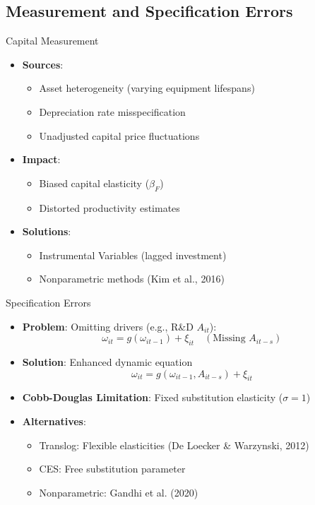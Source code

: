 \documentclass[aspectratio=169]{beamer}  %
\begin{document}
\subsection{Measurement and Specification Errors}
\begin{frame}{Capital Measurement}
\begin{itemize}
    \item \textbf{Sources}:
    \begin{itemize}
        \item Asset heterogeneity (varying equipment lifespans)
        \item Depreciation rate misspecification
        \item Unadjusted capital price fluctuations
    \end{itemize}
    
    \item \textbf{Impact}:
    \begin{itemize}
        \item Biased capital elasticity (\(\beta_F\))
        \item Distorted productivity estimates
    \end{itemize}
    
    \item \textbf{Solutions}:
    \begin{itemize}
        \item Instrumental Variables (lagged investment)
        \item Nonparametric methods (Kim et al., 2016)
    \end{itemize}
\end{itemize}
\end{frame}

\begin{frame}{Specification Errors}
\begin{itemize}
    \item \textbf{Problem}: Omitting drivers (e.g., R\&D \(A_{it}\)):
    \[
    \omega_{it} = g(\omega_{it-1}) + \xi_{it} \quad (\text{Missing } A_{it-s})
    \]
    
    \item \textbf{Solution}: Enhanced dynamic equation
    \[
    \omega_{it} = g(\omega_{it-1}, A_{it-s}) + \xi_{it}
    \]
\end{itemize}

\begin{itemize}
    \item \textbf{Cobb-Douglas Limitation}: Fixed substitution elasticity (\(\sigma=1\))
    \item \textbf{Alternatives}:
    \begin{itemize}
        \item Translog: Flexible elasticities (De Loecker \& Warzynski, 2012)
        \item CES: Free substitution parameter
        \item Nonparametric: Gandhi et al. (2020)
    \end{itemize}
\end{itemize}
\end{frame}
\end{document}

